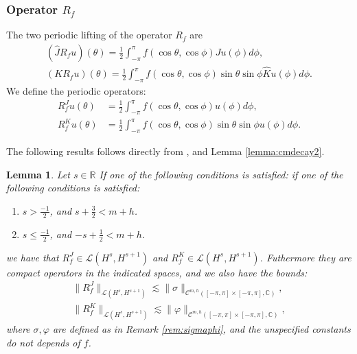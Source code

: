\documentclass{article}
\newtheorem{lemma}[theorem]{Lemma}
\newcommand{\IC}{{\mathbb C}}
\newcommand{\IR}{{\mathbb R}}
\newcommand{\cmspaceh}[4]{\mathcal{C}^{#1,#2} \left( #3, #4 \right)}
\begin{document}
\subsubsection{Operator $R_f$}
The two periodic lifting of the operator $R_f$ are 
\begin{align*}
(\widehat{J}R_f u)(\theta) = \frac{1}{2}\int_{-\pi}^{\pi} f(\cos \theta, \cos \phi) Ju(\phi) d \phi,\\
(K R_f u)(\theta) = \frac{1}{2}\int_{-\pi}^{\pi} f(\cos \theta, \cos \phi) \sin \theta \sin \phi  \widehat{K}u(\phi) d \phi.
\end{align*}
We define the periodic operators:
\begin{align*}
R_f^J u(\theta)  &= \frac{1}{2}\int_{-\pi}^{\pi} f(\cos \theta, \cos \phi) u(\phi) d \phi, \\
R_f^K u (\theta) &= \frac{1}{2}\int_{-\pi}^{\pi} f(\cos \theta, \cos \phi) \sin \theta \sin \phi  u(\phi) d \phi.
\end{align*}

The following results follows directly from \cite[Theorem 6.1.1]{saranen2013periodic}, and Lemma \ref{lemma:cmdecay2}.
\begin{lemma}
\label{lemma:rfper}
Let $s \in \IR$ If one of the following conditions is satisfied: 
if one of the following conditions is satisfied:
\begin{enumerate}
\item $s> \frac{-1}{2}$, and $s + \frac{3}{2} < m+h$.
\item $ s \leq \frac{-1}{2}$, and $-s+ \frac{1}{2} <m+h$. 
\end{enumerate} 
we have that $ R_f^J  \in \mathcal{L}(H^{s},H^{s+1})$ and  $R^K_f  \in \mathcal{L}(H^{s},H^{s+1})$. Futhermore they are compact operators in the indicated spaces, and we also have the bounds: 
\begin{align*}
\| R_f^J\|_{ \mathcal{L}(H^{s},H^{s+1})} \lesssim \|\sigma\|_{\cmspaceh{m}{h}{[-\pi,\pi]\times[-\pi,\pi]}{\IC}},\\
\| R_f^K\|_{ \mathcal{L}(H^{s},H^{s+1})} \lesssim \|\varphi\|_{\cmspaceh{m}{h}{[-\pi,\pi]\times[-\pi,\pi]}{\IC}},
\end{align*}
where $\sigma, \varphi$ are defined as in Remark \ref{rem:sigmaphi}, and the unspecified constants do not depends of $f$.
\end{lemma}
\end{document}
